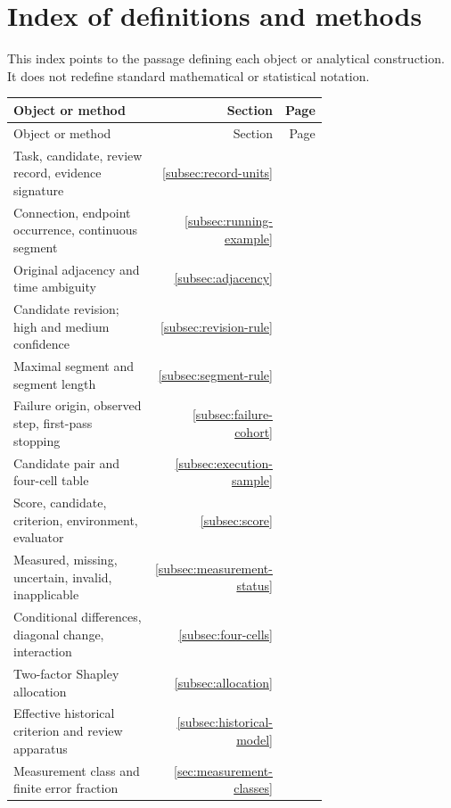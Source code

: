 \section{Index of definitions and methods}
\label{sec:definition-index}
This index points to the passage defining each object or analytical construction. It does not redefine standard mathematical or statistical notation.
\small
\begin{longtable}{p{0.70\linewidth}rr}
\toprule
Object or method & Section & Page\\
\midrule
\endfirsthead
\toprule
Object or method & Section & Page\\
\midrule
\endhead
\bottomrule
\endfoot
Task, candidate, review record, evidence signature & \ref{subsec:record-units} & \pageref{subsec:record-units} \\
Connection, endpoint occurrence, continuous segment & \ref{subsec:running-example} & \pageref{subsec:running-example} \\
Original adjacency and time ambiguity & \ref{subsec:adjacency} & \pageref{subsec:adjacency} \\
Candidate revision; high and medium confidence & \ref{subsec:revision-rule} & \pageref{subsec:revision-rule} \\
Maximal segment and segment length & \ref{subsec:segment-rule} & \pageref{subsec:segment-rule} \\
Failure origin, observed step, first-pass stopping & \ref{subsec:failure-cohort} & \pageref{subsec:failure-cohort} \\
Candidate pair and four-cell table & \ref{subsec:execution-sample} & \pageref{subsec:execution-sample} \\
Score, candidate, criterion, environment, evaluator & \ref{subsec:score} & \pageref{subsec:score} \\
Measured, missing, uncertain, invalid, inapplicable & \ref{subsec:measurement-status} & \pageref{subsec:measurement-status} \\
Conditional differences, diagonal change, interaction & \ref{subsec:four-cells} & \pageref{subsec:four-cells} \\
Two-factor Shapley allocation & \ref{subsec:allocation} & \pageref{subsec:allocation} \\
Effective historical criterion and review apparatus & \ref{subsec:historical-model} & \pageref{subsec:historical-model} \\
Measurement class and finite error fraction & \ref{sec:measurement-classes} & \pageref{sec:measurement-classes} \\

\end{longtable}
